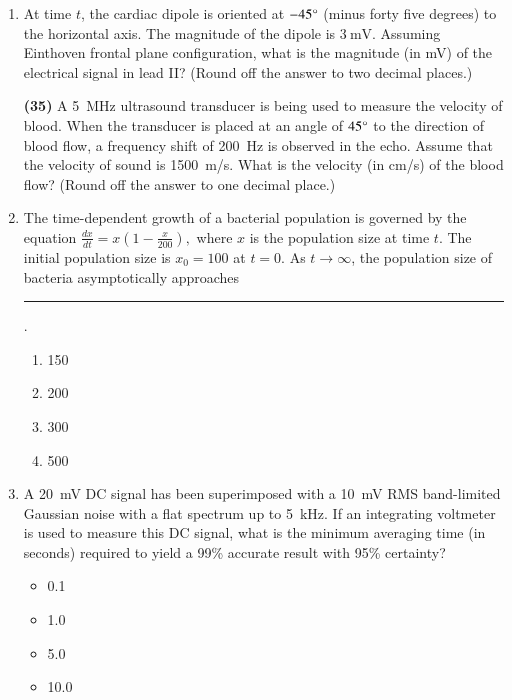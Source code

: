\documentclass[journal]{IEEEtran}
\begin{document}
\begin{enumerate}
\item  At time \( t \), the cardiac dipole is oriented at \(-45\degree\) (minus forty five degrees) to the horizontal axis. The magnitude of the dipole is \(3\ \text{mV}\). Assuming Einthoven frontal plane configuration, what is the magnitude (in mV) of the electrical signal in lead II? (Round off the answer to two decimal places.)
\hfill{}

\textbf{(35)} A 5~MHz ultrasound transducer is being used to measure the velocity of blood. When the transducer is placed at an angle of \( 45\degree \) to the direction of blood flow, a frequency shift of 200~Hz is observed in the echo. Assume that the velocity of sound is 1500~m/s. What is the velocity (in cm/s) of the blood flow? (Round off the answer to one decimal place.)

\hfill{}

\item  The time-dependent growth of a bacterial population is governed by the equation
$
\frac{dx}{dt} = x \left(1 - \frac{x}{200} \right),
$
where \( x \) is the population size at time \( t \). The initial population size is \( x_0 = 100 \) at \( t = 0 \). As \( t \to \infty \), the population size of bacteria asymptotically approaches \rule{4cm}{0.15mm}.

\begin{enumerate}
    \item 150
    \item 200
    \item 300
    \item 500
\end{enumerate}
\hfill{}

\item  
A \SI{20}{\milli\volt} DC signal has been superimposed with a \SI{10}{\milli\volt} RMS band-limited Gaussian noise with a flat spectrum up to \SI{5}{\kilo\hertz}. If an integrating voltmeter is used to measure this DC signal, what is the minimum averaging time (in seconds) required to yield a 99\% accurate result with 95\% certainty?

\begin{itemize}
  \item 0.1
  \item 1.0
  \item 5.0
  \item 10.0
\end{itemize}
\hfill{}


\end{enumerate}
\end{document}
